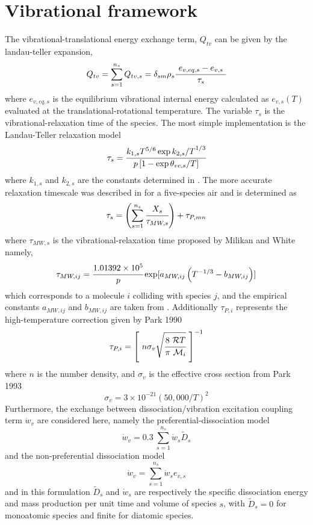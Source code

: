 \section{Vibrational framework}
The vibrational-translational energy exchange term, $Q_{tv}$ can be given by the landau-teller expansion, \begin{equation}
    Q_{tv} = \sum_{s=1}^{n_s} Q_{tv,s} = \delta_{sm}  \rho_s \cfrac{\ e_{v,eq,s} - e_{v,s} \ }{\tau_s}
\end{equation} where $e_{v,eq,s} $ is the equilibrium vibrational internal energy calculated as $e_{v,s}(T)$ evaluated at the translational-rotational temperature. The variable $\tau_s$ is the vibrational-relaxation time of the species. The most simple implementation is the Landau-Teller relaxation model \begin{equation}
    \tau_s = \cfrac{k_{1,s} T^{5/6} \exp{k_{2,s}/T}^{1/3}}{p \left[ 1 - \exp{\theta_{vc,s}/T} \right]}
\end{equation} where $k_{1,s}$ and $k_{2,s}$ are the constants determined in \cite{Vincenti1965}. The more accurate relaxation timescale was described in \cite{Park1993} for a five-species air and is determined as \begin{equation}
    \tau_s = \left( \sum_{s=1}^{n_s} \cfrac{X_s}{\tau_{MW,s}}  \right) + \tau_{P,mn}
\end{equation} where $\tau_{MW,s}$ is the vibrational-relaxation time proposed by Milikan and White namely, \begin{equation}
    \tau_{MW,ij} = \cfrac{1.01392 \times 10^{5}}{p} \exp[a_{MW,ij} \left( T^{-1/3} - b_{MW,ij} \right)]
\end{equation} which corresponds to a molecule $i$ colliding with species $j$, and the empirical constants $a_{MW,ij}$ and $b_{MW, ij}$ are taken from \cite{Park1993}. Additionally $\tau_{P,i}$ represents the high-temperature correction given by Park 1990 \begin{equation}
    \tau_{P,i} = \left[ \  n \sigma_{v} \sqrt{\cfrac{8 \ \mathcal{R} T}{\pi \ \mathcal{M}_i}} \ \right]^{-1}
\end{equation} where $n$ is the number density, and $\sigma_{v}$ is the effective cross section from Park 1993 \begin{equation}
    \sigma_{v} = 3 \times 10^{-21} (50,000/T)^2
\end{equation} Furthermore, the exchange between dissociation/vibration excitation coupling term $\dot{w}_v$ are considered here, namely the preferential-dissociation model \begin{equation}
    \dot{w}_{v} = 0.3 \ \sum_{s=1}^{n_s} \dot{w}_{s} \tilde D_{s} 
\end{equation} and the non-preferential dissociation model \begin{equation}
    \dot{w}_{v} = \sum_{s=1}^{n_s} \dot{w}_s e_{v,s}
\end{equation} and in this formulation $\tilde D_s$ and $\dot{w}_s$ are respectively the specific dissociation energy and mass production per unit time and volume of species $s$, with $\tilde D_s = 0$ for monoatomic species and finite for diatomic species. 


